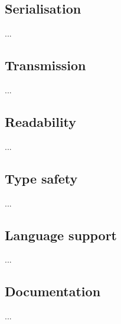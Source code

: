 \documentclass[../report.tex]{subfiles}
\begin{document}
\subsection{Serialisation}

...

\subsection{Transmission}

...

\subsection{Readability}

...

\subsection{Type safety}

...

\subsection{Language support}

...

\subsection{Documentation}

...
\end{document}
